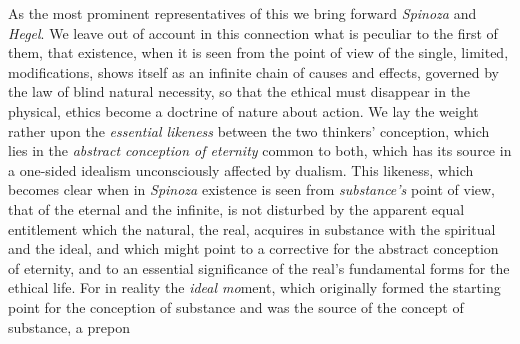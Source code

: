 \documentclass[12pt,a4paper]{book}
\begin{document}
As the most prominent representatives of this we bring forward \emph{Spinoza}
and \emph{Hegel}. We leave out of account in this connection what is peculiar to
the first of them, that existence, when it is seen from the point of view of the
single, limited, modifications, shows itself as an infinite chain of causes and
effects, governed by the law of blind natural necessity, so that the ethical
must disappear in the physical, ethics become a doctrine of nature about action.
We lay the weight rather upon the \emph{essential likeness} between the two
thinkers' conception, which lies in the \emph{abstract conception of eternity}
common to both, which has its source in a one-sided idealism unconsciously
affected by dualism. This likeness, which becomes clear when in \emph{Spinoza}
existence is seen from \emph{substance's} point of view, that of the eternal and
the infinite, is not disturbed by the apparent equal entitlement which the
natural, the real, acquires in substance with the spiritual and the ideal, and
which might point to a corrective for the abstract conception of eternity, and
to an essential significance of the real's fundamental forms for the ethical
life. For in reality the \emph{ideal mo}ment, which originally formed the
starting point for the conception of substance and was the source of the
concept of substance, a prepon\-%
\end{document}
